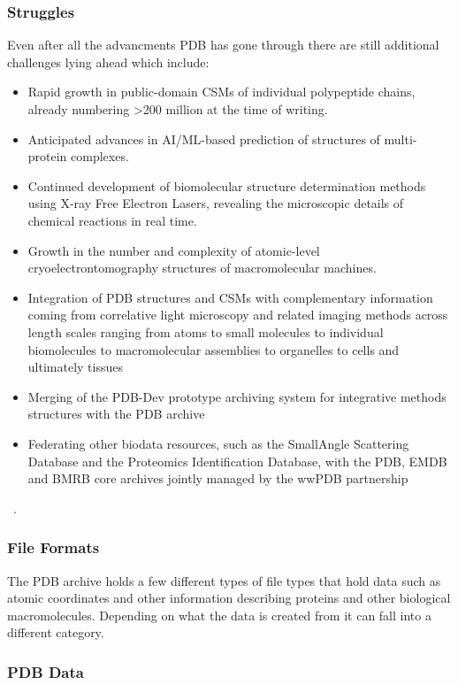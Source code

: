 \documentclass[]{final_report}
\begin{document}
\subsubsection{Struggles}
Even after all the advancments PDB has gone through there are still additional challenges lying ahead which include:

\begin{itemize}
    \item Rapid growth in public-domain CSMs of individual polypeptide chains, already numbering >200 million at the time of writing.
    \item Anticipated advances in AI/ML-based prediction of structures of multi-protein complexes.
    \item Continued development of biomolecular structure determination methods using X-ray Free Electron Lasers, revealing the microscopic details of chemical reactions in real time.
    \item Growth in the number and complexity of atomic-level cryoelectrontomography structures of macromolecular machines.
    \item Integration of PDB structures and CSMs with complementary information coming from correlative light microscopy and related imaging methods across length scales ranging from atoms to small molecules to individual biomolecules to macromolecular assemblies to organelles to cells and ultimately tissues
    \item Merging of the PDB-Dev prototype archiving system for integrative methods structures with the PDB archive
    \item Federating other biodata resources, such as the SmallAngle Scattering Database and the Proteomics Identification Database, with the PDB, EMDB and BMRB core archives jointly managed by the wwPDB partnership
\end{itemize}
~\cite{burley1_rcsb_2022}.

\subsubsection{File Formats}

The PDB archive holds a few different types of file types that hold data such as atomic coordinates and other information describing proteins and other biological macromolecules. Depending on what the data is created from it can fall into a different category.

\subsubsection{PDB Data}
\end{document}
